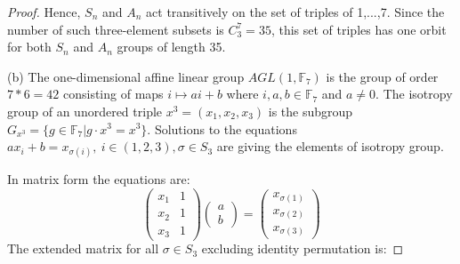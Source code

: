 \documentclass[11pt,a4paper]{article}
\begin{document}
{\begin{proof}
Hence, $S_n$ and $A_n$ act transitively on the set of triples of {1,...,7}. Since the number of such three-element subsets is $C_3^7=35$, this set of triples has one orbit for both $S_n$ and $A_n$ groups of length 35. 
\item[(b)] The one-dimensional affine linear group $AGL(1,\mathbb{F}_7)$ is the group of order $7*6=42$ consisting of maps $i\mapsto ai+b$ where $i,a,b \in \mathbb{F}_7$ and $a \ne 0$. The isotropy group of an unordered triple $x^3=(x_1,x_2,x_3)$ is the subgroup $G_{x^3}=\{g\in \mathbb{F}_7 | g\cdot x^3=x^3\}$. Solutions to the equations $ax_i+b=x_{\sigma(i)},~i\in(1,2,3), \sigma \in S_3$ are giving the elements of isotropy group.

In matrix form the equations are:
$$
\left(\begin{array}{rr}
x_{1} & 1 \\
x_{2} & 1 \\
x_{3} & 1 
\end{array}\right)
\left(\begin{array}{r}
a \\
b 
\end{array}\right)=
\left(\begin{array}{r}
x_{\sigma(1)}  \\
x_{\sigma(2)}  \\
x_{\sigma(3)}  
\end{array}\right)
$$
The extended matrix for all $\sigma \in S_3$ excluding identity permutation is: 


\end{proof}}
\end{document}
